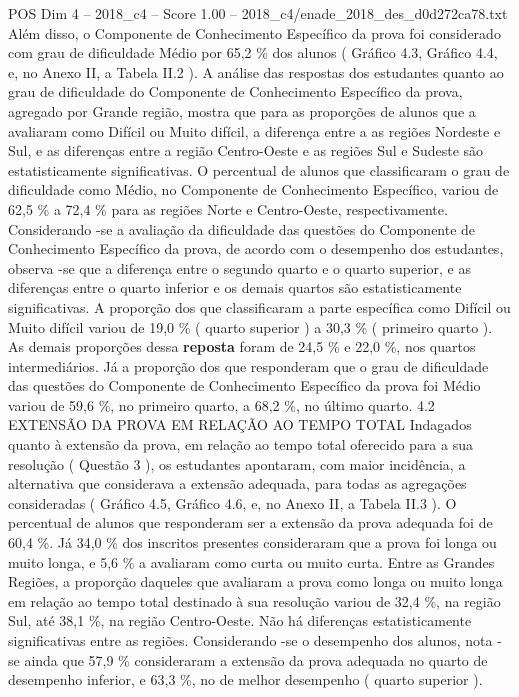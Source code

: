 \begin{textsample}{POS Dim 4 – 2018\_c4 – Score 1.00 – 2018\_c4/enade\_2018\_des\_d0d272ca78.txt}
Além disso, o Componente de Conhecimento Específico da prova foi considerado com grau de dificuldade Médio por 65,2 \% dos alunos ( Gráfico 4.3, Gráfico 4.4, e, no Anexo II, a Tabela II.2 ).
A análise das respostas dos estudantes quanto ao grau de dificuldade do Componente de Conhecimento Específico da prova, agregado por Grande região, mostra que para as proporções de alunos que a avaliaram como Difícil ou Muito difícil, a diferença entre a as regiões Nordeste e Sul, e as diferenças entre a região Centro-Oeste e as regiões Sul e Sudeste são estatisticamente significativas.
O percentual de alunos que classificaram o grau de dificuldade como Médio, no Componente de Conhecimento Específico, variou de 62,5 \% a 72,4 \% para as regiões Norte e Centro-Oeste, respectivamente.
Considerando -se a avaliação da dificuldade das questões do Componente de Conhecimento Específico da prova, de acordo com o desempenho dos estudantes, observa -se que a diferença entre o segundo quarto e o quarto superior, e as diferenças entre o quarto inferior e os demais quartos são estatisticamente significativas.
A proporção dos que classificaram a parte específica como Difícil ou Muito difícil variou de 19,0 \% ( quarto superior ) a 30,3 \% ( primeiro quarto ).
As demais proporções dessa \textbf{reposta} foram de 24,5 \% e 22,0 \%, nos quartos intermediários.
Já a proporção dos que responderam que o grau de dificuldade das questões do Componente de Conhecimento Específico da prova foi Médio variou de 59,6 \%, no primeiro quarto, a 68,2 \%, no último quarto. 4.2 EXTENSÃO DA PROVA EM RELAÇÃO AO TEMPO TOTAL Indagados quanto à extensão da prova, em relação ao tempo total oferecido para a sua resolução ( Questão 3 ), os estudantes apontaram, com maior incidência, a alternativa que considerava a extensão adequada, para todas as agregações consideradas ( Gráfico 4.5, Gráfico 4.6, e, no Anexo II, a Tabela II.3 ).
O percentual de alunos que responderam ser a extensão da prova adequada foi de 60,4 \%.
Já 34,0 \% dos inscritos presentes consideraram que a prova foi longa ou muito longa, e 5,6 \% a avaliaram como curta ou muito curta.
Entre as Grandes Regiões, a proporção daqueles que avaliaram a prova como longa ou muito longa em relação ao tempo total destinado à sua resolução variou de 32,4 \%, na região Sul, até 38,1 \%, na região Centro-Oeste.
Não há diferenças estatisticamente significativas entre as regiões.
Considerando -se o desempenho dos alunos, nota -se ainda que 57,9 \% consideraram a extensão da prova adequada no quarto de desempenho inferior, e 63,3 \%, no de melhor desempenho ( quarto superior ).

\end{textsample}
